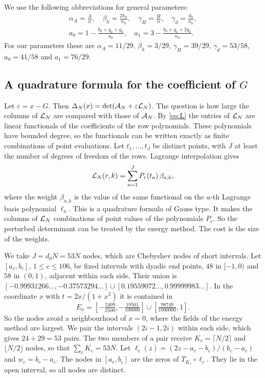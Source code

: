 We use the following abbreviations for general parameters:
\begin{gather*}
 \alpha_A=\frac An,\quad \beta_h=\frac{2h_0}{n_0},\quad \gamma_H=\frac Hn,\quad \gamma_d=\frac{d_0}{n_0},\\
 a_0=1-\frac{b_0+q_0+g_0}{n_0},\quad a_1=3-\frac{b_0+q_0+2g_0}{n_0}.
\end{gather*}
For our parameters these are $\alpha_A=11/29$, $\beta_h=3/29$, $\gamma_H=39/29$, $\gamma_d=53/58$,
$a_0=41/58$ and $a_1=76/29$.

\subsection{A quadrature formula for the coefficient of $G$}\label{ssec:quadrature}
Let $\varepsilon=x-G$. Then $\Delta_N(x)=\det(\mathcal A_N+\varepsilon\mathcal L_N)$. The question is how large the columns
of $\mathcal L_N$ are compared with those of $\mathcal A_N$. By \eqref{eq:L} the entries of $\mathcal L_N$ are linear
functionals of the coefficients of the row polynomials. These polynomials have bounded degree, so the
functionals can be written exactly as finite combinations of point evaluations. Let $t_1,\ldots,t_J$ be
distinct points, with $J$ at least the number of degrees of freedom of the rows. Lagrange interpolation
gives
\begin{equation}\label{eq:quad}
 \mathcal L_N(r,k)=\sum_{a=1}^JP_r(t_a)\,\beta_{a,k},
\end{equation}
where the weight $\beta_{a,k}$ is the value of the same functional on the $a$-th Lagrange basis polynomial
$\ell_a$. This is a quadrature formula of Gauss type. It makes the columns of $\mathcal L_N$ combinations of point
values of the polynomials $P_r$. So the perturbed determinant can be treated by the energy
method. The cost is the size of the weights.

We take $J=d_0N=53N$ nodes, which are Chebyshev nodes of short intervals. Let $[a_c,b_c]$,
$1\le c\le106$, be fixed intervals with dyadic end points, $48$ in $[-1,0)$ and $58$ in $(0,1)$, adjacent
within each side. Their union is $[-0.99931266\ldots,-0.37573294\ldots]\cup[0.19559072\ldots,0.99999983\ldots]$. In
the coordinate $x$ with $t=2x/(1+x^2)$ it is contained in
\[
 E_x=[-\tfrac{2409}{2500},-\tfrac{19501}{100000}]\cup[\tfrac{98749}{1000000},1].
\]
So the nodes avoid a neighbourhood of $x=0$, where the fields of the energy method are largest. We pair the
intervals $(2i-1,2i)$ within each side, which gives $24+29=53$ pairs. The two members of a pair receive
$K_c=\lceil N/2\rceil$ and $\lfloor N/2\rfloor$ nodes, so that $\sum_cK_c=53N$. Let
$\ell_c(z)=(2z-a_c-b_c)/(b_c-a_c)$ and $w_c=b_c-a_c$. The nodes in $[a_c,b_c]$ are the zeros of
$T_{K_c}\circ\ell_c$. They lie in the open interval, so all nodes are distinct.

